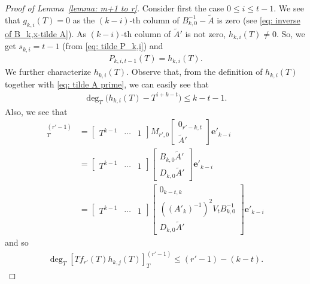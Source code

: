 \documentclass[10pt,a4paper]{amsart}
\begin{document}
\begin{proof}[Proof of Lemma~\ref{lemma: m+1 to r}]
Consider first the case $0\leq i\leq t-1$. We see that $g_{k,i}(T)=0$ as the $(k-i)$-th column of $B_{k,0}^{-1}-\tilde A$ is zero (see \eqref{eq: inverse of B_k,x-tilde A}). As $(k-i)$-th column of $\tilde A'$ is not zero, $h_{k,i}(T)\neq 0$. So, we get $s_{k,i}=t-1$ (from \eqref{eq: tilde P_k,i}) and
    \begin{align*}
        P_{k,i,t-1}(T)
        =h_{k,i}(T).
    \end{align*}
We further characterize $h_{k,i}(T)$. Observe that, from the definition of $h_{k,i}(T)$ together with \eqref{eq: tilde A prime}, we can easily see that
    \begin{align*}
        \deg_T\big(h_{k,i}(T)-T^{i+k-t}\big)
        \leq
        k-t-1.
    \end{align*}
Also, we see that
    \begin{align*}
        [Tf_{r'}(T)h_{k,i}(T)]_{T}^{(r'-1)}
        &=
        \begin{bmatrix}
            T^{k-1} & \cdots & 1
        \end{bmatrix}
        M_{r',0}
        \begin{bmatrix}
            0_{r'-k,t} \\
            \tilde A'
        \end{bmatrix}
        \mathbf{e}'_{k-i}
        \\&=
        \begin{bmatrix}
            T^{k-1} & \cdots & 1
        \end{bmatrix}
        \begin{bmatrix}
          B_{k,0}\tilde A' \\
          D_{k,0}\tilde A'
        \end{bmatrix}
        \mathbf{e}'_{k-i}
        \\&=
        \begin{bmatrix}
            T^{k-1} & \cdots & 1
        \end{bmatrix}
        \begin{bmatrix}
            0_{k-t,k} \\
            ((A'_k)^{-1})^2V_tB_{k,0}^{-1}\\
            D_{k,0}\tilde A'
        \end{bmatrix}
        \mathbf{e}'_{k-i}
    \end{align*}
and so
    \begin{align*}
        \deg_T [Tf_{r'}(T)h_{k,j}(T)]_{T}^{(r'-1)} \leq (r'-1)-(k-t).
    \end{align*}

\end{proof}
\end{document}
